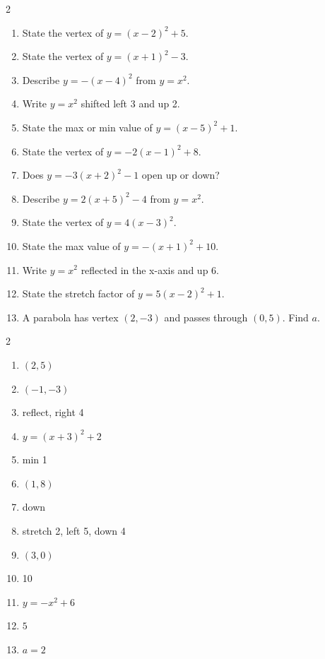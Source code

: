 \documentclass[11pt]{article}
\begin{document}
\begin{recapbox}
\begin{multicols}{2}
\small
\begin{enumerate}[leftmargin=*,itemsep=3pt]
  \item State the vertex of $y=(x-2)^2+5$.
  \item State the vertex of $y=(x+1)^2-3$.
  \item Describe $y=-(x-4)^2$ from $y=x^2$.
  \item Write $y=x^2$ shifted left 3 and up 2.
  \item State the max or min value of $y=(x-5)^2+1$.
  \item State the vertex of $y=-2(x-1)^2+8$.
  \item Does $y=-3(x+2)^2-1$ open up or down?
  \item Describe $y=2(x+5)^2-4$ from $y=x^2$.
  \item State the vertex of $y=4(x-3)^2$.
  \item State the max value of $y=-(x+1)^2+10$.
  \item Write $y=x^2$ reflected in the x-axis and up 6.
  \item State the stretch factor of $y=5(x-2)^2+1$.
  \item A parabola has vertex $(2,-3)$ and passes through $(0,5)$. Find $a$.
\end{enumerate}
\end{multicols}
\end{recapbox}

\begin{keybox}
\begin{multicols}{2}
\small
\begin{enumerate}[leftmargin=*,itemsep=3pt]
  \item $(2,5)$
  \item $(-1,-3)$
  \item reflect, right 4
  \item $y=(x+3)^2+2$
  \item min 1
  \item $(1,8)$
  \item down
  \item stretch 2, left 5, down 4
  \item $(3,0)$
  \item 10
  \item $y=-x^2+6$
  \item $5$
  \item $a=2$
\end{enumerate}
\end{multicols}
\end{keybox}
\end{document}
